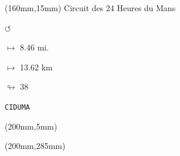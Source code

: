 \begin{textblock*}{40mm}(160mm,15mm)%
Circuit des 24 Heures du Mans
\par \Huge$\circlearrowleft$
\Large
\par$\mapsto$ 8.46 mi.
\par$\mapsto$ 13.62 km
\par$\looparrowright$ 38
\par\hfill\tiny\tt CIDUMA\\
\end{textblock*}
\begin{textblock*}{20mm}(200mm,5mm)%
\fbox{\thepage}
\end{textblock*}
\begin{textblock*}{20mm}(200mm,285mm)%
\fbox{\thepage}
\end{textblock*}
\null\newpage

